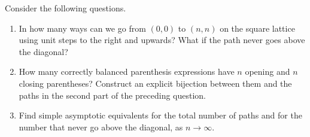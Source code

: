 \documentclass[11pt,a4paper]{article}
\newenvironment{enumeratea}{\begin{enumerate}[label=(\alph*),itemsep=0.28em,topsep=0.25em]}{\end{enumerate}}
\newcounter{problem}[section]
\begin{document}
\begin{problemstar}
Consider the following questions.
\begin{enumeratea}
  \item In how many ways can we go from $(0,0)$ to $(n,n)$ on the square lattice
  using unit steps to the right and upwards? What if the path never goes above the diagonal?
  \item How many correctly balanced parenthesis expressions have $n$ opening and $n$
  closing parentheses? Construct an explicit bijection between them and the paths
  in the second part of the preceding question.
  \item Find simple asymptotic equivalents for the total number of paths and for the
  number that never go above the diagonal, as $n\to\infty$.
\end{enumeratea}
\end{problemstar}
\end{document}
